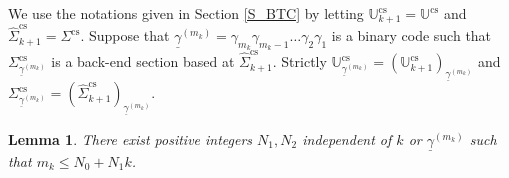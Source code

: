\documentclass{amsart}
\newtheorem{lem}[thm]{Lemma}
\theoremstyle{definition}
\numberwithin{equation}{section}
\numberwithin{figure}{section}
\begin{document}
We use the notations given in Section \ref{S_BTC} by letting $\mathbb{U}_{k+1}^{\mathrm{cs}}=\mathbb{U}^{\mathrm{cs}}$ and 
$\widehat\Sigma_{k+1}^{\mathrm{cs}}=\Sigma^{\mathrm{cs}}$.
Suppose that $\underline{\gamma}^{(m_k)}=\gamma_{m_k}\gamma_{m_k-1}\dots \gamma_2\gamma_1$ is a binary code such that 
$\Sigma_{\underline{\gamma}^{(m_k)}}^{\mathrm{cs}}$ is a back-end section based at $\widehat{\Sigma}_{k+1}^{\mathrm{cs}}$.
Strictly $\mathbb{U}_{\underline{\gamma}^{(m_k)}}^{\mathrm{cs}}=(\mathbb{U}_{k+1}^{\mathrm{cs}})_{\underline{\gamma}^{(m_k)}}$ and 
$\Sigma_{\underline{\gamma}^{(m_k)}}^{\mathrm{cs}}=(\widehat{\Sigma}_{k+1}^{\mathrm{cs}})_{\underline{\gamma}^{(m_k)}}$.


\begin{lem}\label{l_transf}
There exist positive integers $N_1,N_2$ independent of $k$ or $\underline{\gamma}^{(m_k)}$ such that 
$m_k\leq N_0+N_1k$.
\end{lem}
\end{document}
